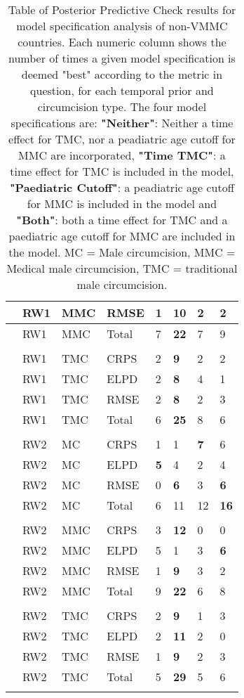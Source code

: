 \documentclass{article}
\begin{document}
{\begin{longtable}[c]{llllllll}
        & RW1 & MMC & RMSE & 1 & \bf{10} & 2 & 2 \\ 
        \hline 
        & RW1 & MMC & Total & 7 & \bf{22} & 7 & 9 \\ 
        \hline \\ 
        & RW1 & TMC & CRPS & 2 & \bf{9} & 2 & 2 \\ 
        & RW1 & TMC & ELPD & 2 & \bf{8} & 4 & 1 \\ 
        & RW1 & TMC & RMSE & 2 & \bf{8} & 2 & 3 \\ 
        \hline 
        & RW1 & TMC & Total & 6 & \bf{25} & 8 & 6 \\ 
        \hline \\ 
        & RW2 & MC & CRPS & 1 & 1 & \bf{7} & 6 \\ 
        & RW2 & MC & ELPD & \bf{5} & 4 & 2 & 4 \\ 
        & RW2 & MC & RMSE & 0 & \bf{6} & 3 & \bf{6} \\ 
        \hline 
        & RW2 & MC & Total & 6 & 11 & 12 & \bf{16} \\ 
        \hline \\ 
        & RW2 & MMC & CRPS & 3 & \bf{12} & 0 & 0 \\ 
        & RW2 & MMC & ELPD & 5 & 1 & 3 & \bf{6} \\ 
        & RW2 & MMC & RMSE & 1 & \bf{9} & 3 & 2 \\ 
        \hline 
        & RW2 & MMC & Total & 9 & \bf{22} & 6 & 8 \\ 
        \hline \\ 
        & RW2 & TMC & CRPS & 2 & \bf{9} & 1 & 3 \\ 
        & RW2 & TMC & ELPD & 2 & \bf{11} & 2 & 0 \\ 
        & RW2 & TMC & RMSE & 1 & \bf{9} & 2 & 3 \\ 
        \hline 
        & RW2 & TMC & Total & 5 & \bf{29} & 5 & 6 \\ 
        \bottomrule
    \caption{Table of Posterior Predictive Check results for model specification analysis of non-VMMC countries. 
    Each numeric column shows the number of times a given model specification is deemed "best" according to the metric in question, for each temporal prior and circumcision type. The four model specifications are: \textbf{"Neither"}: Neither a time effect for TMC, nor a peadiatric age cutoff for MMC are incorporated, \textbf{"Time TMC"}: a time effect for TMC is included in the model, \textbf{"Paediatric Cutoff"}: a peadiatric age cutoff for MMC is included in the model and \textbf{"Both"}: both a time effect for TMC and a paediatric age cutoff for MMC are included in the model. MC = Male circumcision, MMC = Medical male circumcision, TMC = traditional male circumcision.
    }
\end{longtable}
}
\end{document}

